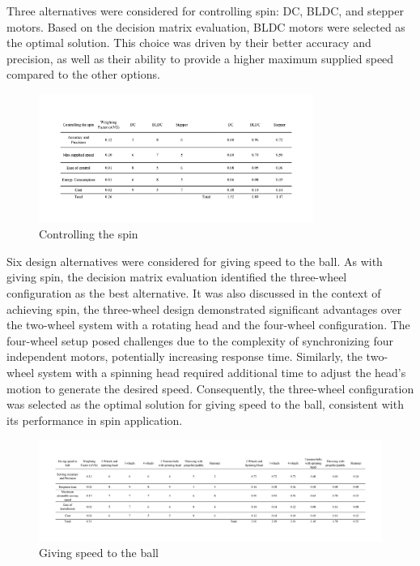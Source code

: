 \documentclass[12pt]{report}
\begin{document}
Three alternatives were considered for controlling spin: DC, BLDC, and stepper motors. Based on the decision matrix evaluation, BLDC motors were selected as the optimal solution. This choice was driven by their better accuracy and precision, as well as their ability to provide a higher maximum supplied speed compared to the other options.
\begin{figure}[H]
    \centering
    \includegraphics[width=0.8\textwidth]{Decision matrices/controlling spin.png}
    \caption{Controlling the spin}
\end{figure}


Six design alternatives were considered for giving speed to the ball. As with giving spin, the decision matrix evaluation identified the three-wheel configuration as the best alternative. It was also discussed in the context of achieving spin, the three-wheel design demonstrated significant advantages over the two-wheel system with a rotating head and the four-wheel configuration. The four-wheel setup posed challenges due to the complexity of synchronizing four independent motors, potentially increasing response time. Similarly, the two-wheel system with a spinning head required additional time to adjust the head's motion to generate the desired speed. Consequently, the three-wheel configuration was selected as the optimal solution for giving speed to the ball, consistent with its performance in spin application.

\begin{figure}[H]
    \centering
    \includegraphics[width=1\textwidth]{Decision matrices/speed.png}
    \caption{Giving speed to the ball}
\end{figure}
\end{document}
